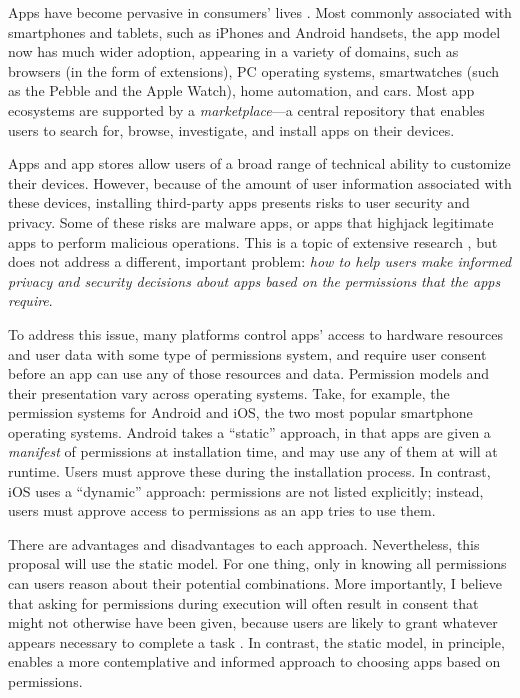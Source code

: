 \documentclass[11pt]{article}
\begin{document}
Apps have become pervasive
in consumers' lives 
\cite{gplay-50-billion, apple-50-billion}.
Most commonly associated with smartphones and tablets, 
such as iPhones and Android handsets, the app model now has much 
wider adoption, appearing in a variety of domains,
such as browsers (in the form of extensions), PC operating 
systems, smartwatches (such as the Pebble and the Apple Watch), 
home automation,
and cars.
Most app ecosystems are supported by a
\emph{marketplace}---a central repository that
enables users to search for, browse,
investigate, and install apps on their devices. 

Apps and app stores allow users of a broad range
of technical ability to customize their devices.
However,  
because of the amount of user information associated with these 
devices, installing third-party apps presents 
risks to user security and privacy. Some of these risks are malware apps, or 
apps that highjack legitimate apps
to perform malicious operations. This is a topic
of extensive research 
\cite{droidrisk-2013, android-repackaged-CODASPY12, comDroid-MOBISYS11}, 
but does not address a different,
important problem: \emph{how to help users make informed privacy and
  security decisions about apps based on the permissions that the apps
  require}.

To address this issue, many
platforms control apps' access to hardware resources 
and user data with some type of permissions system,
and require user consent before an app can use any
of those resources and data. Permission models and their presentation 
vary across operating systems. Take, for example, the permission systems
for Android and iOS, the two most popular smartphone operating systems. 
Android takes a ``static'' approach, in that apps are given a
\emph{manifest} of
permissions at installation time, and may use any of them at will at runtime.
Users must approve these during the installation
process. In contrast, iOS uses a ``dynamic''
approach: permissions are not listed explicitly; instead, users must
approve access to permissions as an app tries to use them.

There are advantages and disadvantages to each approach. Nevertheless,
this proposal will use the static model. For one thing, only in 
knowing all permissions can users reason about their potential
combinations. More importantly, I believe that asking for permissions
during execution will often result in consent that might not otherwise
have been given, because users are likely to grant whatever appears
necessary to complete a task \cite{phisher-wanings-SIGCHI08}. In contrast, the static
model, in principle, enables a more contemplative and
informed approach to choosing apps based on permissions.
\end{document}
